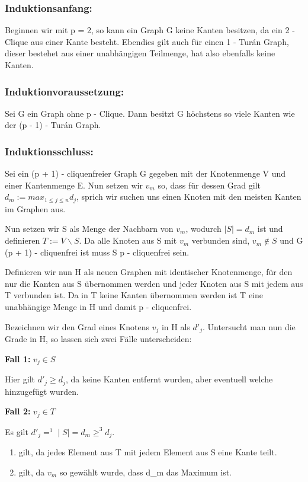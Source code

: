 \documentclass[12pt, a4paper]{article}
\begin{document}
\subsubsection{Induktionsanfang:}

Beginnen wir mit p = 2, so kann ein Graph G keine Kanten besitzen, da ein 2 - Clique aus einer Kante besteht. Ebendies gilt auch für einen 1 - Turán Graph, dieser bestehet aus einer unabhängigen Teilmenge, hat also ebenfalls keine Kanten.

\subsubsection{Induktionvoraussetzung:}

Sei G ein Graph ohne p - Clique. Dann besitzt G höchstens so viele Kanten wie der (p - 1) - Turán Graph.

\subsubsection{Induktionsschluss:}

Sei ein (p + 1) - cliquenfreier Graph G gegeben mit der Knotenmenge V und einer Kantenmenge E. Nun setzen wir $v_m$ so, dass für dessen Grad gilt $d_m := max_{1 \le j \le n} d_j$, sprich wir suchen uns einen Knoten mit den meisten Kanten im Graphen aus.

Nun setzen wir S als Menge der Nachbarn von $v_m$, wodurch $\mid S \mid = d_m$ ist und definieren $T := V \backslash S$. Da alle Knoten aus S mit $v_m$ verbunden sind, $v_m \notin S$ und G (p + 1) - cliquenfrei ist muss S p - cliquenfrei sein.

Definieren wir nun H als neuen Graphen mit identischer Knotenmenge, für den nur die Kanten aus S übernommen werden und jeder Knoten aus S mit jedem aus T verbunden ist. Da in T keine Kanten übernommen werden ist T eine unabhängige Menge in H und damit p - cliquenfrei.

Bezeichnen wir den Grad eines Knotens $v_j$ in H als $d'_j$. Untersucht man nun die Grade in H, so lassen sich zwei Fälle unterscheiden:

\textbf{Fall 1:} $v_j \in S$

Hier gilt $d'_j \ge d_j$, da keine Kanten entfernt wurden, aber eventuell welche hinzugefügt wurden.

\textbf{Fall 2:} $v_j \in T$

Es gilt $d'_j =^1 \mid S \mid = d_m \ge^3 d_j$.
\begin{enumerate}
\item {}
gilt, da jedes Element aus T mit jedem Element aus S eine Kante teilt.

\item {}
gilt, da $v_m$ so gewählt wurde, dass d\_m das Maximum ist.

\end{enumerate}
\end{document}
